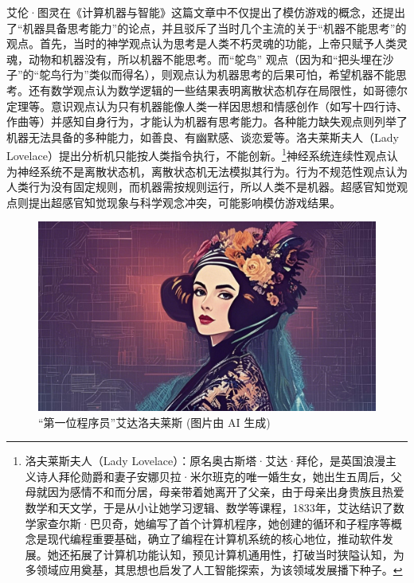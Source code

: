 艾伦·图灵在《计算机器与智能》这篇文章中不仅提出了模仿游戏的概念，还提出了“机器具备思考能力”的论点，并且驳斥了当时几个主流的关于“机器不能思考”的观点。首先，当时的神学观点认为思考是人类不朽灵魂的功能，上帝只赋予人类灵魂，动物和机器没有，所以机器不能思考。而“鸵鸟” 观点（因为和“把头埋在沙子”的“鸵鸟行为”类似而得名），则观点认为机器思考的后果可怕，希望机器不能思考。还有数学观点认为数学逻辑的一些结果表明离散状态机存在局限性，如哥德尔定理等。意识观点认为只有机器能像人类一样因思想和情感创作（如写十四行诗、作曲等）并感知自身行为，才能认为机器有思考能力。各种能力缺失观点则列举了机器无法具备的多种能力，如善良、有幽默感、谈恋爱等。洛夫莱斯夫人（Lady Lovelace）提出分析机只能按人类指令执行，不能创新。\footnote{洛夫莱斯夫人（Lady Lovelace）：原名奥古斯塔·艾达·拜伦，是英国浪漫主义诗人拜伦勋爵和妻子安娜贝拉·米尔班克的唯一婚生女，她出生五周后，父母就因为感情不和而分居，母亲带着她离开了父亲，由于母亲出身贵族且热爱数学和天文学，于是从小让她学习逻辑、数学等课程，1833年，艾达结识了数学家查尔斯·巴贝奇，她编写了首个计算机程序，她创建的循环和子程序等概念是现代编程重要基础，确立了编程在计算机系统的核心地位，推动软件发展。她还拓展了计算机功能认知，预见计算机通用性，打破当时狭隘认知，为多领域应用奠基，其思想也启发了人工智能探索，为该领域发展播下种子。}神经系统连续性观点认为神经系统不是离散状态机，离散状态机无法模拟其行为。行为不规范性观点认为人类行为没有固定规则，而机器需按规则运行，所以人类不是机器。超感官知觉观点则提出超感官知觉现象与科学观念冲突，可能影响模仿游戏结果。
\begin{figure}[htb]
    \centering
    \includegraphics[width=0.75\linewidth]{image/1/lovelance.png}
    \caption{“第一位程序员”艾达洛夫莱斯 (图片由 AI 生成)}
\end{figure}


